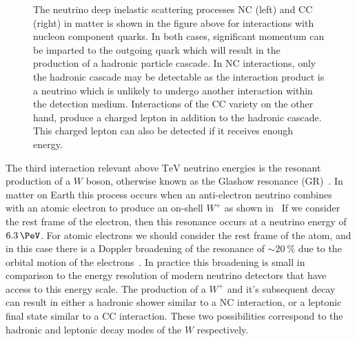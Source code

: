 \begin{figure}
	\centering
	\caption{The neutrino deep inelastic scattering processes NC (left) and CC (right) in matter is shown in the figure above for interactions with nucleon component quarks.
	In both cases, significant momentum can be imparted to the outgoing quark which will result in the production of a hadronic particle cascade.
	In NC interactions, only the hadronic cascade may be detectable as the interaction product is a neutrino which is unlikely to undergo another interaction within the detection medium.
	Interactions of the CC variety on the other hand, produce a charged lepton in addition to the hadronic cascade.
	This charged lepton can also be detected if it receives enough energy.}
	\label{fig:DIS}
\end{figure}

The third interaction relevant above $\si\TeV$ neutrino energies is the resonant production of a $W$ boson, otherwise known as the Glashow resonance (GR)~\cite{Glashow:1960zz}.
In matter on Earth this process occurs when an anti-electron neutrino combines with an atomic electron to produce an on-shell $W^+$ as shown in~
If we consider the rest frame of the electron, then this resonance occurs at a neutrino energy of $\SI{6.3}\PeV$.
For atomic electrons we should consider the rest frame of the atom, and in this case there is a Doppler broadening of the resonance of $\sim\SI{20}\percent$ due to the orbital motion of the electrons~\cite{Loewy:2014zva}.
In practice this broadening is small in comparison to the energy resolution of modern neutrino detectors that have access to this energy scale.
The production of a $W^+$ and it's subsequent decay can result in either a hadronic shower similar to a NC interaction, or a leptonic final state similar to a CC interaction.
These two possibilities correspond to the hadronic and leptonic decay modes of the $W$ respectively.

